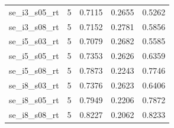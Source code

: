 \begin{tabular}{lrrrr}
se\_i3\_s05\_rt & 5 & 0.7115 & 0.2655 & 0.5262 \\
se\_i3\_s08\_rt & 5 & 0.7152 & 0.2781 & 0.5856 \\
se\_i5\_s03\_rt & 5 & 0.7079 & 0.2682 & 0.5585 \\
se\_i5\_s05\_rt & 5 & 0.7353 & 0.2626 & 0.6359 \\
se\_i5\_s08\_rt & 5 & 0.7873 & 0.2243 & 0.7746 \\
se\_i8\_s03\_rt & 5 & 0.7376 & 0.2623 & 0.6406 \\
se\_i8\_s05\_rt & 5 & 0.7949 & 0.2206 & 0.7872 \\
se\_i8\_s08\_rt & 5 & 0.8227 & 0.2062 & 0.8233 \\
\bottomrule
\end{tabular}
